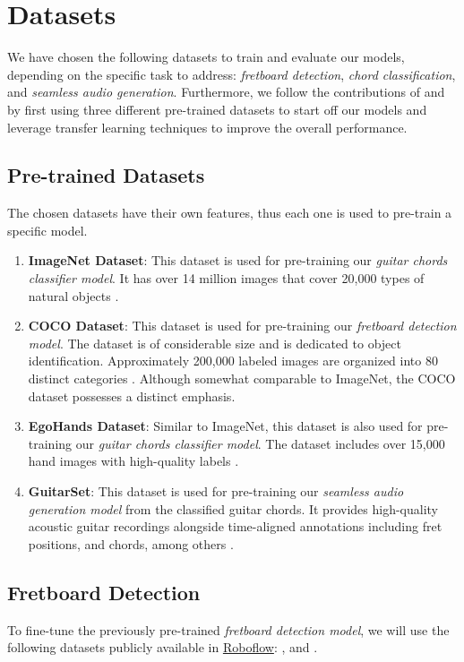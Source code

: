 \documentclass[10pt,twocolumn,letterpaper]{article}
\begin{document}
\section{Datasets}\label{sec:datasets}

We have chosen the following datasets to train and evaluate our models, depending on the specific task to address: \emph{fretboard detection}, \emph{chord classification}, and \emph{seamless audio generation}. Furthermore, we follow the contributions of \cite{Kristian_Zaman_Tenoyo_Jodhinata_2024} and \cite{Jadhav_transferlearning} by first using three different pre-trained datasets to start off our models and leverage transfer learning techniques to improve the overall performance.
\subsection{Pre-trained Datasets}
The chosen datasets have their own features, thus each one is used to pre-train a specific model.

\begin{enumerate}[label=\arabic*), itemsep=0.25pt]
    \item \textbf{ImageNet Dataset}: This dataset is used for pre-training our \emph{guitar chords classifier model}. It has over 14 million images that cover 20,000 types of natural objects \cite{russakovsky2015imagenetlargescalevisual}.
    \item \textbf{COCO Dataset}: This dataset is used for pre-training our \emph{fretboard detection model}. The dataset is of considerable size and is dedicated to object identification. Approximately 200,000 labeled images are organized into 80 distinct categories \cite{lin2015microsoftcococommonobjects}. Although somewhat comparable to ImageNet, the COCO dataset possesses a distinct emphasis.
    \item \textbf{EgoHands Dataset}: Similar to ImageNet, this dataset is also used for pre-training our \emph{guitar chords classifier model}. The dataset includes over 15,000 hand images with high-quality labels \cite{Bambach_2015_ICCV}.
    \item \textbf{GuitarSet}: This dataset is used for pre-training our \emph{seamless audio generation model} from the classified guitar chords. It provides high-quality acoustic guitar recordings alongside time-aligned annotations including fret positions, and chords, among others \cite{Xi2018}.
\end{enumerate}

\subsection{Fretboard Detection}\label{subsec:fretboard-detection}
To fine-tune the previously pre-trained \emph{fretboard detection model}, we will use the following datasets publicly available in \href{https://universe.roboflow.com/}{Roboflow}: \cite{guitar-chords-daewp_dataset}, \cite{guitar-ppfil_dataset} and \cite{done-npcll_dataset}.
\end{document}
